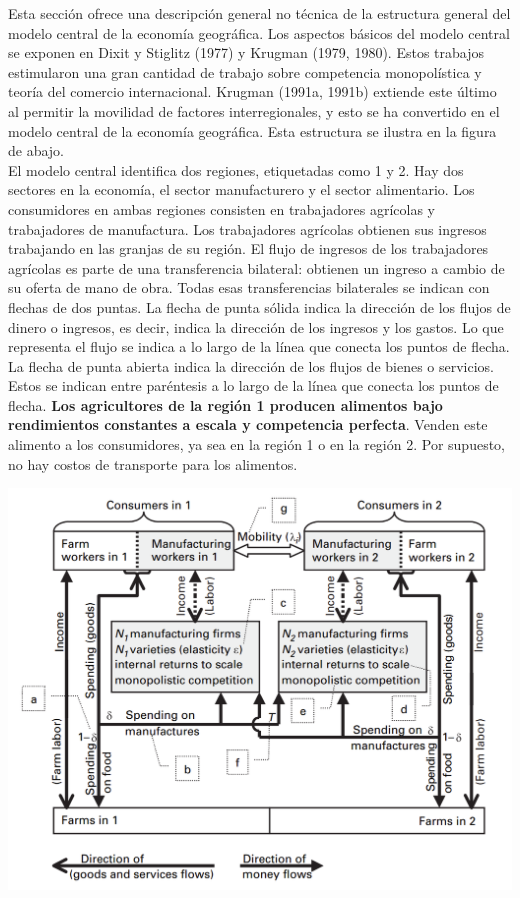 Esta sección ofrece una descripción general no técnica de la estructura general del modelo central de la economía geográfica. Los aspectos básicos del modelo central se exponen en Dixit y Stiglitz (1977) y Krugman (1979, 1980). Estos trabajos estimularon una gran cantidad de trabajo sobre competencia monopolística y teoría del comercio internacional. Krugman (1991a, 1991b) extiende este último al permitir la movilidad de factores interregionales, y esto se ha convertido en el modelo central de la economía geográfica. Esta estructura se ilustra en la figura de abajo. \\
El modelo central identifica dos regiones, etiquetadas como 1 y 2. Hay dos sectores en la economía, el sector manufacturero y el sector alimentario. Los consumidores en ambas regiones consisten en trabajadores agrícolas y trabajadores de manufactura. Los trabajadores agrícolas obtienen sus ingresos trabajando en las granjas de su región. El flujo de ingresos de los trabajadores agrícolas es parte de una transferencia bilateral: obtienen un ingreso a cambio de su oferta de mano de obra. Todas esas transferencias bilaterales se indican con flechas de dos puntas. La flecha de punta sólida indica la dirección de los flujos de dinero o ingresos, es decir, indica la dirección de los ingresos y los gastos. Lo que representa el flujo se indica a lo largo de la línea que conecta los puntos de flecha. La flecha de punta abierta indica la dirección de los flujos de bienes o servicios. Estos se indican entre paréntesis a lo largo de la línea que conecta los puntos de flecha. \textbf{Los agricultores de la región 1 producen alimentos bajo rendimientos constantes a escala y competencia perfecta}. Venden este alimento a los consumidores, ya sea en la región 1 o en la región 2. Por supuesto, no hay costos de transporte para los alimentos.\\

\begin{center}
\includegraphics[scale=.4]{./imagen/diag.png}
\end{center}

